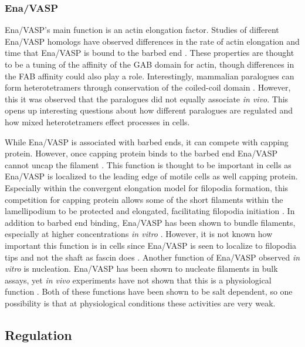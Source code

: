 \subsubsection{Ena/VASP}
Ena/VASP's main function is an actin elongation factor. Studies of different Ena/VASP homologs have observed differences in the rate of actin elongation and time that Ena/VASP is bound to the barbed end \citep{breitsprecher_clustering_2008,breitsprecher_molecular_2011,hansen_vasp_2010,winkelman_ena/vasp_2014}. These properties are thought to be a tuning of the affinity of the GAB domain for actin, though differences in the FAB affinity could also play a role. Interestingly, mammalian paralogues can form heterotetramers through conservation of the coiled-coil domain \citep{riquelme_selectivity_2015}. However, this it was observed that the paralogues did not equally associate \textit{in vivo}. This opens up interesting questions about how different paralogues are regulated and how mixed heterotetramers effect processes in cells. 

While Ena/VASP is associated with barbed ends, it can compete with capping protein. However, once capping protein binds to the barbed end Ena/VASP cannot uncap the filament \citep{applewhite_ena/vasp_2007, bear_ena/vasp:_2009, winkelman_ena/vasp_2014,barzik_ena/vasp_2005}. This function is thought to be important in cells as Ena/VASP is localized to the leading edge of motile cells as well capping protein. Especially within the convergent elongation model for filopodia formation, this competition for capping protein allows some of the short filaments within the lamellipodium to be protected and elongated, facilitating filopodia initiation \citep{svitkina_mechanism_2003}. 
In addition to barbed end binding, Ena/VASP has been shown to bundle filaments, especially at higher concentrations \textit{in vitro} \citep{bachmann_evh2_1999,barzik_ena/vasp_2005}. However, it is not known how important this function is in cells since Ena/VASP is seen to localize to filopodia tips and not the shaft as fascin does \citep{svitkina_mechanism_2003,lanier_mena_1999}. Another function of Ena/VASP observed \textit{in vitro} is nucleation. Ena/VASP has been shown to nucleate filaments in bulk assays, yet \textit{in vivo} experiments have not shown that this is a physiological function \citep{bear_ena/vasp:_2009}. Both of these functions have been shown to be salt dependent, so one possibility is that at physiological conditions these activities are very weak. 

\subsection{Regulation}\label{ena-formin-regulation}

